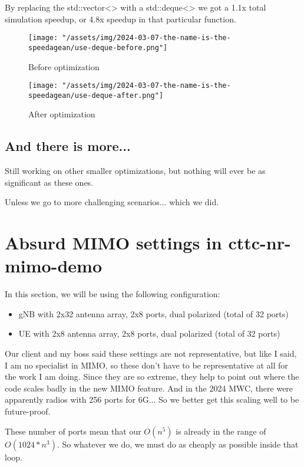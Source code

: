 \documentclass{article}
\begin{document}
By replacing the std::vector<> with a std::deque<> we got a 1.1x total
simulation speedup, or 4.8x speedup in that particular function.

\begin{figure}
    \texttt{[image: "/assets/img/2024-03-07-the-name-is-the-speedagean/use-deque-before.png"]}
    \caption{Before optimization}
    \label{fig:use-deque-before}
\end{figure}

\begin{figure}
    \texttt{[image: "/assets/img/2024-03-07-the-name-is-the-speedagean/use-deque-after.png"]}
    \caption{After optimization}
    \label{fig:use-deque-after}
\end{figure}

\subsection{And there is more...}

Still working on other smaller optimizations,
but nothing will ever be as significant as these ones.

Unless we go to more challenging scenarios... which we did.

\section{Absurd MIMO settings in cttc-nr-mimo-demo}

In this section, we will be using the following configuration:

\begin{itemize}
\item gNB with 2x32 antenna array, 2x8 ports, dual polarized (total of 32 ports)
\item UE with 2x8 antenna array, 2x8 ports, dual polarized (total of 32 ports)
\end{itemize}

Our client and my boss said these settings are not representative, but like
I said, I am no specialist in MIMO, so these don't have to be representative
at all for the work I am doing. Since they are so extreme, they help to point out
where the code scales badly in the new MIMO feature. And in the 2024 MWC, there
were apparently radios with 256 ports for 6G...
So we better get this scaling well to be future-proof.

These number of ports mean that our $O(n^5)$ is already in the range of $O(1024*n^3)$.
So whatever we do, we must do as cheaply as possible inside that loop.
\end{document}
